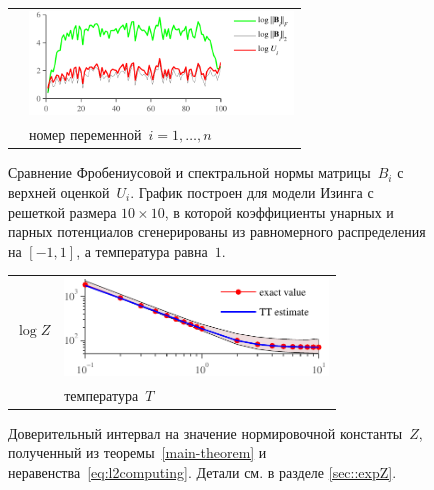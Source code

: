\begin{figure}
\begin{center}
\begin{tabular}{m{0.3cm}@{}m{7cm}}
\begin{sideways}
\parbox{4cm}{\centering\scriptsize   }
\end{sideways}
& \includegraphics[width=7cm]{images/2norm.pdf}
\\
& \parbox{5.3cm}{\centering\scriptsize номер переменной~$i=1,\ldots,n$ } \\
\end{tabular}
\end{center}
\caption{ Сравнение Фробениусовой и спектральной нормы матрицы~$B_i$ с верхней оценкой~$U_i$. График построен для модели Изинга с решеткой размера $10 \times 10$, в которой коэффициенты унарных и парных потенциалов сгенерированы из равномерного распределения на $[-1, 1]$, а температура равна~$1$.
\label{fig:zUpperBound}}
\end{figure}
\begin{figure}
\begin{center}
\begin{tabular}{m{0.3cm}@{}m{7cm}}
\begin{sideways}\parbox{4cm}{\centering\scriptsize  $\log Z$ }\end{sideways}
& \includegraphics[width=7cm]{images/10x10,J=1,average=10,confInt_v3.pdf}
\\
& \parbox{7.3cm}{\centering\scriptsize температура~$T$} \\
\end{tabular}
\end{center}
\caption{Доверительный интервал на значение нормировочной константы~$Z$, полученный из теоремы~\ref{main-theorem} и неравенства~\eqref{eq:l2computing}. Детали см. в разделе \ref{sec::expZ}.  \label{fig:zConf}}
\end{figure}


